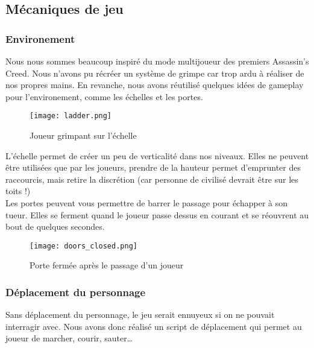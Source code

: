 \subsection{Mécaniques de jeu}

        \subsubsection{Environement}
            Nous nous sommes beaucoup inspiré du mode multijoueur des premiers Assassin's Creed.
            Nous n'avons pu récréer un système de grimpe car trop ardu à réaliser de nos propres mains.
            En revanche, nous avons réutilisé quelques idées de gameplay pour l'environement, comme les échelles et les portes.\\

            \begin{figure}[hbt!]
                \centering
                \texttt{[image: ladder.png]}
                \caption{Joueur grimpant sur l'échelle}
            \end{figure}

            L'échelle permet de créer un peu de verticalité dans nos niveaux.
            Elles ne peuvent être utilisées que par les joueurs,
            prendre de la hauteur permet d'emprunter des raccourcis, mais retire la discrétion (car personne de civilisé devrait être sur les toits !) \\
            
            Les portes peuvent vous permettre de barrer le passage pour échapper à son tueur.
            Elles se ferment quand le joueur passe dessus en courant
            et se réouvrent au bout de quelques secondes.

            \begin{figure}[hbt!]
                \centering
                \texttt{[image: doors\_closed.png]}
                \caption{Porte fermée après le passage d'un joueur}
            \end{figure}

        \subsubsection{Déplacement du personnage}
        
            Sans déplacement du personnage, le jeu serait ennuyeux si on ne pouvait interragir avec.
            Nous avons donc réalisé un script de déplacement qui permet au joueur de marcher, courir, sauter\dots\\


